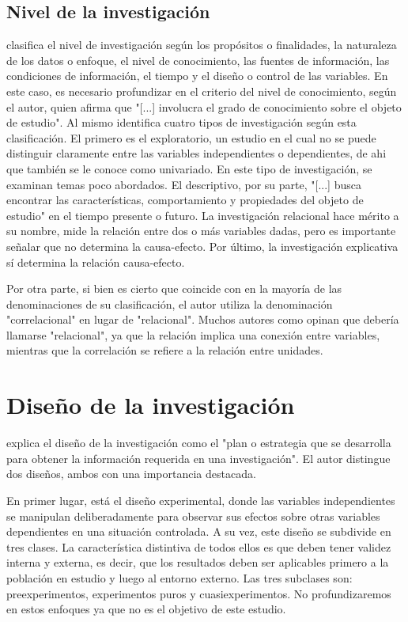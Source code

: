 \subsection{Nivel de la investigación} \label{nivel_invest}

\cite[88]{RiosRamirez2017} clasifica el nivel de investigación según los propósitos o finalidades, la naturaleza de los datos o enfoque, el nivel de conocimiento, las fuentes de información, las condiciones de información, el tiempo y el diseño o control de las variables. En este caso, es necesario profundizar en el criterio del nivel de conocimiento, según el autor, quien afirma que "[...] involucra el grado de conocimiento sobre el objeto de estudio". Al mismo identifica cuatro tipos de investigación según esta clasificación. El primero es el exploratorio, un estudio en el cual no se puede distinguir claramente entre las variables independientes o dependientes, de ahi que también se le conoce como univariado. En este tipo de investigación, se examinan temas poco abordados. El descriptivo, por su parte, "[...] busca encontrar las características, comportamiento y propiedades del objeto de estudio" en el tiempo presente o futuro. La investigación relacional hace mérito a su nombre, mide la relación entre dos o más variables dadas, pero es importante señalar que no determina la causa-efecto. Por último, la investigación explicativa sí determina la relación causa-efecto.

Por otra parte, si bien es cierto que \cite[93]{HernandezSampieri2014} coincide con \citeauthor{RiosRamirez2017} en la mayoría de las denominaciones de su clasificación, el autor utiliza la denominación "correlacional" en lugar de "relacional". Muchos autores como \cite[]{Zacarias2020} opinan que debería llamarse "relacional", ya que la relación implica una conexión entre variables, mientras que la correlación se refiere a la relación entre unidades.

\section{Diseño de la investigación}
\cite[128]{HernandezSampieri2014} explica el diseño de la investigación como el "plan o estrategia que se desarrolla para obtener la información requerida en una investigación". El autor distingue dos diseños, ambos con una importancia destacada. 

En primer lugar, está el diseño experimental, donde las variables independientes se manipulan deliberadamente para observar sus efectos sobre otras variables dependientes en una situación controlada. A su vez, este diseño se subdivide en tres clases. La característica distintiva de todos ellos es que deben tener validez interna y externa, es decir, que los resultados deben ser aplicables primero a la población en estudio y luego al entorno externo. Las tres subclases son: preexperimentos, experimentos puros y cuasiexperimentos. No profundizaremos en estos enfoques ya que no es el objetivo de este estudio.

